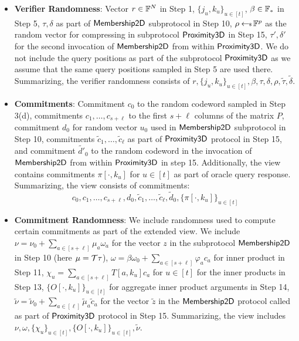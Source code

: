 \begin{itemize}
\item {\bf Verifier Randomness}: Vector $r\in \mathbb{F}^N$ in Step 1,
$\{j_u,k_u\}_{u\in [t]}$, $\beta\in \mathbb{F}_\ast$ in Step 5, $\tau,\delta$ as
part of $\mathsf{Membership2D}$ subprotocol in Step 10, $\rho\hskip2.3pt{\gets\!\!\mbox{\tiny${\$}$\normalsize}}\, \mathbb{F}^p$ as the
random vector for compressing in subprotocol $\mathsf{Proximity3D}$ in Step 15,
$\tau',\delta'$ for the second invocation of $\mathsf{Membership2D}$ from within
$\mathsf{Proximity3D}$. We
do not include the query positions as part of the subprotocol $\mathsf{Proximity3D}$
as we assume that the same query positions sampled in Step 5 are used there.
Summarizing, the verifier randomness consists of $r,\{j_u,k_u\}_{u\in
[t]},\beta,\tau,\delta,\rho,\tilde{\tau},\tilde{\delta}$.

\item {\bf Commitments}: Commitment $c_0$ to the random codeword sampled in Step
3(d), commitments $c_1,\ldots,c_{s+\ell}$ to the first $s+\ell$ columns of the
matrix $P$, commitment $d_0$ for random vector $u_0$ used in $\mathsf{Membership2D}$
subprotocol in Step 10, commitments $\tilde{c}_1,\ldots,\tilde{c}_{\ell}$ as
part of $\mathsf{Proximity3D}$ protocol in Step 15, and commitment $\tilde{d'}_0$ to
the random codeword in the invocation of $\mathsf{Membership2D}$ from within
$\mathsf{Proximity3D}$ in step 15. Additionally, the view contains commitments
$\pi[\cdot,k_u]$ for $u\in [t]$ as part of oracle query response. Summarizing,
the view consists of commitments:
\[ c_0,c_1,\ldots,c_{s+\ell},d_0,\tilde{c}_1,\ldots,\tilde{c}_{\ell},\tilde{d}_0,\{\pi[\cdot,k_u]\}_{u\in
[t]}\]

\item {\bf Commitment Randomness}: We include randomness used to compute certain
commitments as part of the extended view. We include $\nu=\nu_0+\sum_{a\in
[s+\ell]}\mu_a\omega_a$ for the vector $z$ in the subprotocol
$\mathsf{Membership2D}$ in Step 10 (here $\mu=\mathcal{T}\tau$),
$\omega=\beta\omega_0+\sum_{a\in [s+\ell]}\varphi_ac_a$ for inner product in
Step 11, $\chi_u=\sum_{a\in [s+\ell]}T[a,k_u]c_a$ for $u\in [t]$ for the inner
products in Step 13, $\{O[\cdot,k_u]\}_{u\in [t]}$ for aggregate inner product
arguments in Step 14, $\tilde{\nu}=\tilde{\nu}_0+\sum_{a\in
[\ell]}\tilde{\mu}_a\tilde{c}_a$ for the vector $\tilde{z}$ in the
$\mathsf{Membership2D}$ protocol called as part of $\mathsf{Proximity3D}$ protocol in Step
15. Summarizing, the view includes $\nu,\omega,\{\chi_u\}_{u\in
[t]},\{O[\cdot,k_u]\}_{u\in [t]},\tilde{\nu}$.


\end{itemize}
